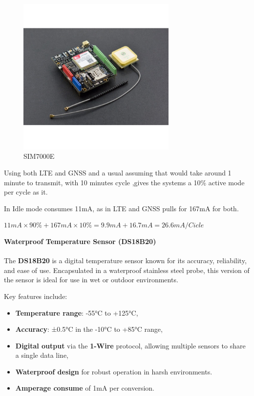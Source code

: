 \begin{figure}[H]
    \centering
    \includegraphics[width=0.7\textwidth]{images/chapter/design/components/SIM7000.png}  %
    \caption{SIM7000E}
    \label{fig:SIM7000E}        
\end{figure}

Using both LTE and GNSS and a usual assuming that would take around 1 minute to transmit, with 10 minutes cycle
,gives the systems a 10\% active mode per cycle as it. 

In Idle mode consumes 11mA, as in LTE and GNSS pulls for 167mA for both.

\( 11 mA×90\%+167 mA×10\%=9.9 mA+16.7 mA=26.6 mA/Cicle\)


\textbf{Waterproof Temperature Sensor (DS18B20)}\\\\
The \textbf{DS18B20} is a digital temperature sensor known for its accuracy, reliability, and ease of use. Encapsulated in a waterproof stainless steel probe, this version of the sensor is ideal for use in wet or outdoor environments.

Key features include:

\begin{itemize}
    \item \textbf{Temperature range}: -55°C to +125°C,
    \item \textbf{Accuracy}: ±0.5°C in the -10°C to +85°C range,
    \item \textbf{Digital output} via the \textbf{1-Wire} protocol, allowing multiple sensors to share a single data line,
    \item \textbf{Waterproof design} for robust operation in harsh environments.
    \item \textbf{Amperage consume} of 1mA per conversion.
\end{itemize} 

